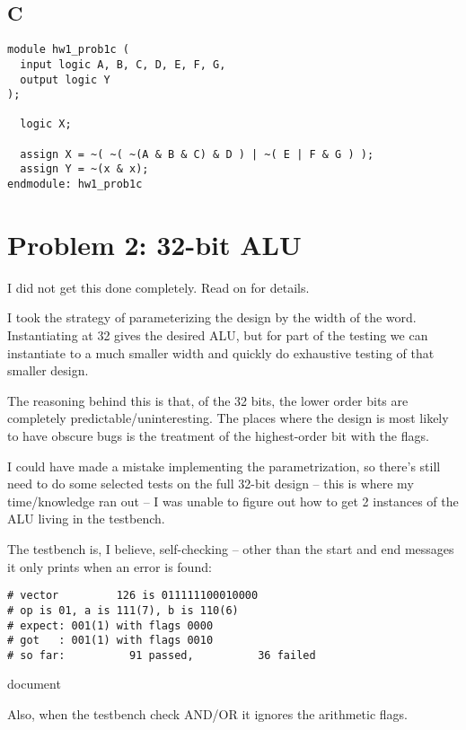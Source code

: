 \documentclass{article}
\begin{document}
\subsection{C}

\begin{Verbatim}[frame=single]
module hw1_prob1c (
  input logic A, B, C, D, E, F, G,
  output logic Y
);

  logic X;

  assign X = ~( ~( ~(A & B & C) & D ) | ~( E | F & G ) );
  assign Y = ~(x & x);
endmodule: hw1_prob1c
\end{Verbatim}
\section{Problem 2: 32-bit ALU}

I did not get this done completely.  Read on for details.

I took the strategy of parameterizing the design by the width of the word.
Instantiating at 32 gives the desired ALU, but for part of the testing
we can instantiate to a much smaller width and quickly do exhaustive testing
of that smaller design.

The reasoning behind this is that, of the 32 bits, the lower order
bits are completely predictable/uninteresting.  The places where the
design is most likely to have obscure bugs is the treatment of the
highest-order bit with the flags.

I could have made a mistake implementing the parametrization, so there's still
need to do some selected tests on the full 32-bit design -- this is where my time/knowledge ran out --
I was unable to figure out how to get 2 instances of the ALU living in the testbench.

The testbench is, I believe, self-checking -- other than the start and end messages it only prints when an error is found:
\begin{verbatim}
# vector         126 is 011111100010000
# op is 01, a is 111(7), b is 110(6)
# expect: 001(1) with flags 0000
# got   : 001(1) with flags 0010
# so far:          91 passed,          36 failed
\end{verbatim}
{document}

Also, when the testbench check AND/OR it ignores the arithmetic flags.

\end{document}
